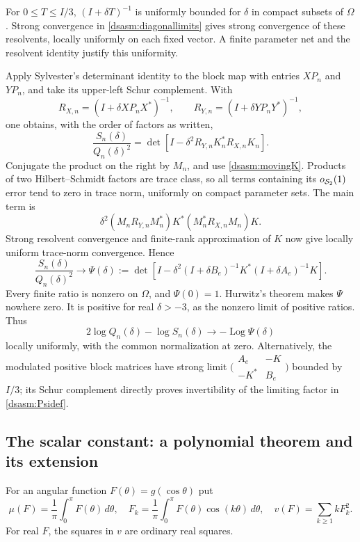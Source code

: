 \documentclass[11pt,letterpaper]{article}
\theoremstyle{remark}\newtheorem{remark}[theorem]{Remark}
\DeclareMathOperator{\Log}{Log}\DeclareMathOperator{\Var}{Var}
\begin{document}
For $0\le T\le I/3$, $(I+\delta T)^{-1}$ is uniformly bounded
for $\delta$ in compact subsets of $\Omega$. Strong convergence
in \eqref{dsasm:diagonallimits} gives strong convergence of these resolvents,
locally uniformly on each fixed vector. A finite parameter net and
the resolvent identity justify this uniformity.

Apply Sylvester's determinant identity to the block map with entries
$XP_n$ and $YP_n$, and take its upper-left Schur complement. With
\[
 R_{X,n}=(I+\delta XP_nX^*)^{-1},\qquad
 R_{Y,n}=(I+\delta YP_nY^*)^{-1},
\]
one obtains, with the order of factors as written,
\begin{equation}\label{dsasm:schur}
 \frac{S_n(\delta)}{Q_n(\delta)^2}
 =\det[I-\delta^2R_{Y,n}K_n^*R_{X,n}K_n].
\end{equation}
Conjugate the product on the right by $M_n$, and use
\eqref{dsasm:movingK}. Products of two Hilbert--Schmidt factors are trace
class, so all terms containing its $o_{\mathcal S_2}(1)$ error tend to zero
in trace norm, uniformly on compact parameter sets. The main term is
\[
 \delta^2(M_nR_{Y,n}M_n^*)K^*(M_n^*R_{X,n}M_n)K.
\]
Strong resolvent convergence and finite-rank approximation of $K$
now give locally uniform trace-norm convergence. Hence
\begin{equation}\label{dsasm:Psidef}
 \frac{S_n(\delta)}{Q_n(\delta)^2}\longrightarrow\Psi(\delta):=
 \det\!\left[I-\delta^2(I+\delta B_e)^{-1}K^*
                              (I+\delta A_e)^{-1}K\right].
\end{equation}
Every finite ratio is nonzero on $\Omega$, and $\Psi(0)=1$.
Hurwitz's theorem makes $\Psi$ nowhere zero. It is positive for
real $\delta>-3$, as the nonzero limit of positive ratios. Thus
\begin{equation}\label{dsasm:mixedlimit}
 2\log Q_n(\delta)-\log S_n(\delta)\longrightarrow-\Log\Psi(\delta)
\end{equation}
locally uniformly, with the common normalization at zero. Alternatively,
the modulated positive block matrices have strong limit
$\bigl(\begin{smallmatrix}A_e&-K\\-K^*&B_e\end{smallmatrix}\bigr)$
bounded by $I/3$; its Schur complement directly proves invertibility
of the limiting factor in \eqref{dsasm:Psidef}.

\subsection{The scalar constant: a polynomial theorem and its extension}
For an angular function $F(\theta)=g(\cos\theta)$ put
\[
 \mu(F)=\frac1\pi\int_0^\pi F(\theta)\,d\theta,\quad
 F_k=\frac1\pi\int_0^\pi F(\theta)\cos(k\theta)\,d\theta,\quad
 v(F)=\sum_{k\ge1}kF_k^2.
\]
For real $F$, the squares in $v$ are ordinary real squares.
\end{document}
